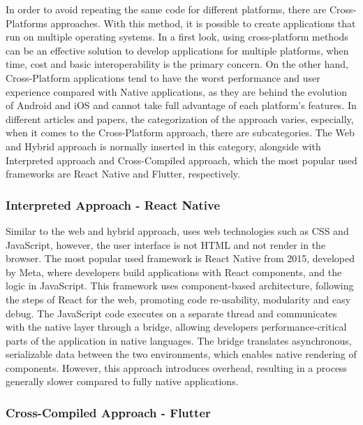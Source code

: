 In order to avoid repeating the same code for different platforms, there are Cross-Platforms approaches. With this method, it is possible to create applications that run on multiple operating systems. In a first look, using cross-platform methods can be an effective solution to develop applications for multiple platforms, when time, cost and basic interoperability is the primary concern. On the other hand, Cross-Platform applications tend to have the worst performance and user experience compared with Native applications, as they are behind the evolution of Android and iOS and cannot take full advantage of each platform's features\cite{Nagy2022}. In different articles and papers, the categorization of the approach varies, especially, when it comes to the Cross-Platform approach, there are subcategories\cite{ELKASSAS2017163}. The Web and Hybrid approach is normally inserted in this category, alongside with Interpreted approach and Cross-Compiled approach\cite{ELKASSAS2017163}, which the most popular used frameworks are React Native and Flutter, respectively.

\subsubsection{Interpreted Approach - React Native}

Similar to the web and hybrid approach, uses web technologies such as CSS and JavaScript, however, the user interface is not HTML and not render in the browser.\cite{Huber2021} The most popular used framework is React Native from 2015, developed by Meta, where developers build applications with React components, and the logic in JavaScript. This framework uses component-based architecture, following the steps of React for the web, promoting code re-usability, modularity and easy debug.\cite{10667693} The JavaScript code executes on a separate thread and communicates with the native layer through a bridge\cite{Nagy2022}, allowing developers performance-critical parts of the application in native languages\cite{10667693}. The bridge translates asynchronous, serializable data between the two environments, which enables native rendering of components. However, this approach introduces overhead, resulting in a process generally slower compared to fully native applications.\cite{Nagy2022}

\subsubsection{Cross-Compiled Approach - Flutter}

